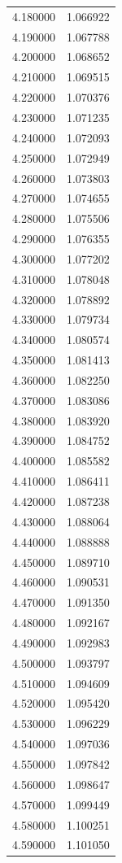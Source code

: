 \begin{tabular}{rr}
4.180000 & 1.066922 \\
4.190000 & 1.067788 \\
4.200000 & 1.068652 \\
4.210000 & 1.069515 \\
4.220000 & 1.070376 \\
4.230000 & 1.071235 \\
4.240000 & 1.072093 \\
4.250000 & 1.072949 \\
4.260000 & 1.073803 \\
4.270000 & 1.074655 \\
4.280000 & 1.075506 \\
4.290000 & 1.076355 \\
4.300000 & 1.077202 \\
4.310000 & 1.078048 \\
4.320000 & 1.078892 \\
4.330000 & 1.079734 \\
4.340000 & 1.080574 \\
4.350000 & 1.081413 \\
4.360000 & 1.082250 \\
4.370000 & 1.083086 \\
4.380000 & 1.083920 \\
4.390000 & 1.084752 \\
4.400000 & 1.085582 \\
4.410000 & 1.086411 \\
4.420000 & 1.087238 \\
4.430000 & 1.088064 \\
4.440000 & 1.088888 \\
4.450000 & 1.089710 \\
4.460000 & 1.090531 \\
4.470000 & 1.091350 \\
4.480000 & 1.092167 \\
4.490000 & 1.092983 \\
4.500000 & 1.093797 \\
4.510000 & 1.094609 \\
4.520000 & 1.095420 \\
4.530000 & 1.096229 \\
4.540000 & 1.097036 \\
4.550000 & 1.097842 \\
4.560000 & 1.098647 \\
4.570000 & 1.099449 \\
4.580000 & 1.100251 \\
4.590000 & 1.101050 \\

\end{tabular}
